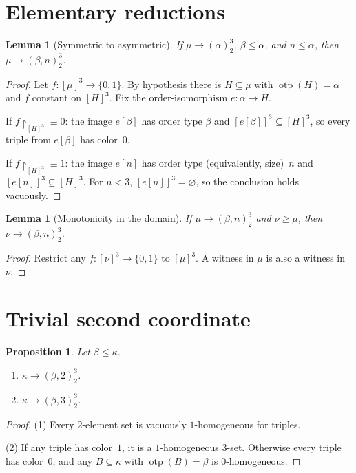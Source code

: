 \documentclass[11pt]{article}
\newtheorem{lemma}[theorem]{Lemma}
\newtheorem{proposition}[theorem]{Proposition}
\theoremstyle{definition}
\theoremstyle{remark}
\newcommand{\otp}{\operatorname{otp}}
\begin{document}
\section{Elementary reductions}

\begin{lemma}[Symmetric to asymmetric]
\label{lem:sym-asym}
If $\mu\to(\alpha)^3_2$, $\beta\le\alpha$, and $n\le\alpha$, then $\mu\to(\beta,n)^3_2$.
\end{lemma}

\begin{proof}
Let $f:[\mu]^3\to\{0,1\}$. By hypothesis there is $H\subseteq\mu$ with $\otp(H)=\alpha$ and $f$ constant on $[H]^3$. Fix the order-isomorphism $e:\alpha\to H$.

If $f\!\restriction_{[H]^3}\equiv 0$: the image $e[\beta]$ has order type $\beta$ and $[e[\beta]]^3\subseteq[H]^3$, so every triple from $e[\beta]$ has color~$0$.

If $f\!\restriction_{[H]^3}\equiv 1$: the image $e[n]$ has order type (equivalently, size)~$n$ and $[e[n]]^3\subseteq[H]^3$. For $n<3$, $[e[n]]^3=\varnothing$, so the conclusion holds vacuously.
\end{proof}

\begin{lemma}[Monotonicity in the domain]
\label{lem:mono}
If $\mu\to(\beta,n)^3_2$ and $\nu\ge\mu$, then $\nu\to(\beta,n)^3_2$.
\end{lemma}

\begin{proof}
Restrict any $f:[\nu]^3\to\{0,1\}$ to $[\mu]^3$. A witness in $\mu$ is also a witness in $\nu$.
\end{proof}

\section{Trivial second coordinate}

\begin{proposition}
\label{prop:trivial}
Let $\beta\le\kappa$.
\begin{enumerate}[leftmargin=2em]
\item $\kappa\to(\beta,2)^3_2$.
\item $\kappa\to(\beta,3)^3_2$.
\end{enumerate}
\end{proposition}

\begin{proof}
(1) Every $2$-element set is vacuously $1$-homogeneous for triples.

(2) If any triple has color~$1$, it is a $1$-homogeneous $3$-set. Otherwise every triple has color~$0$, and any $B\subseteq\kappa$ with $\otp(B)=\beta$ is $0$-homogeneous.
\end{proof}
\end{document}
